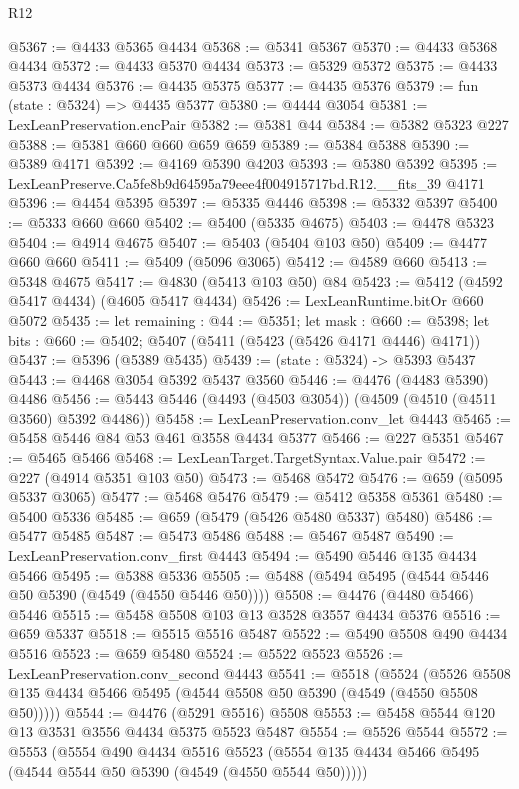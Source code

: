 \begin{lexlean}{R12}
\begin{coremodule}
@5367 := @4433 @5365 @4434
@5368 := @5341 @5367
@5370 := @4433 @5368 @4434
@5372 := @4433 @5370 @4434
@5373 := @5329 @5372
@5375 := @4433 @5373 @4434
@5376 := @4435 @5375
@5377 := @4435 @5376
@5379 := fun (state : @5324) => @4435 @5377
@5380 := @4444 @3054
@5381 := LexLeanPreservation.encPair
@5382 := @5381 @44
@5384 := @5382 @5323 @227
@5388 := @5381 @660 @660 @659 @659
@5389 := @5384 @5388
@5390 := @5389 @4171
@5392 := @4169 @5390 @4203
@5393 := @5380 @5392
@5395 := LexLeanPreserve.Ca5fe8b9d64595a79eee4f004915717bd.R12.__fits_39 @4171
@5396 := @4454 @5395
@5397 := @5335 @4446
@5398 := @5332 @5397
@5400 := @5333 @660 @660
@5402 := @5400 (@5335 @4675)
@5403 := @4478 @5323
@5404 := @4914 @4675
@5407 := @5403 (@5404 @103 @50)
@5409 := @4477 @660 @660
@5411 := @5409 (@5096 @3065)
@5412 := @4589 @660
@5413 := @5348 @4675
@5417 := @4830 (@5413 @103 @50) @84
@5423 := @5412 (@4592 @5417 @4434) (@4605 @5417 @4434)
@5426 := LexLeanRuntime.bitOr @660 @5072
@5435 := let remaining : @44 := @5351;
  let mask : @660 := @5398;
  let bits : @660 := @5402; @5407 (@5411 (@5423 (@5426 @4171 @4446) @4171))
@5437 := @5396 (@5389 @5435)
@5439 := (state : @5324) -> @5393 @5437
@5443 := @4468 @3054 @5392 @5437 @3560
@5446 := @4476 (@4483 @5390) @4486
@5456 := @5443 @5446 (@4493 (@4503 @3054)) (@4509 (@4510 (@4511 @3560) @5392 @4486))
@5458 := LexLeanPreservation.conv_let @4443
@5465 := @5458 @5446 @84 @53 @461 @3558 @4434 @5377
@5466 := @227 @5351
@5467 := @5465 @5466
@5468 := LexLeanTarget.TargetSyntax.Value.pair
@5472 := @227 (@4914 @5351 @103 @50)
@5473 := @5468 @5472
@5476 := @659 (@5095 @5337 @3065)
@5477 := @5468 @5476
@5479 := @5412 @5358 @5361
@5480 := @5400 @5336
@5485 := @659 (@5479 (@5426 @5480 @5337) @5480)
@5486 := @5477 @5485
@5487 := @5473 @5486
@5488 := @5467 @5487
@5490 := LexLeanPreservation.conv_first @4443
@5494 := @5490 @5446 @135 @4434 @5466
@5495 := @5388 @5336
@5505 := @5488 (@5494 @5495 (@4544 @5446 @50 @5390 (@4549 (@4550 @5446 @50))))
@5508 := @4476 (@4480 @5466) @5446
@5515 := @5458 @5508 @103 @13 @3528 @3557 @4434 @5376
@5516 := @659 @5337
@5518 := @5515 @5516 @5487
@5522 := @5490 @5508 @490 @4434 @5516
@5523 := @659 @5480
@5524 := @5522 @5523
@5526 := LexLeanPreservation.conv_second @4443
@5541 := @5518
    (@5524 (@5526 @5508 @135 @4434 @5466 @5495 (@4544 @5508 @50 @5390 (@4549 (@4550 @5508 @50)))))
@5544 := @4476 (@5291 @5516) @5508
@5553 := @5458 @5544 @120 @13 @3531 @3556 @4434 @5375 @5523 @5487
@5554 := @5526 @5544
@5572 := @5553
    (@5554
      @490
      @4434
      @5516
      @5523
      (@5554 @135 @4434 @5466 @5495 (@4544 @5544 @50 @5390 (@4549 (@4550 @5544 @50)))))

\end{coremodule}
\end{lexlean}
